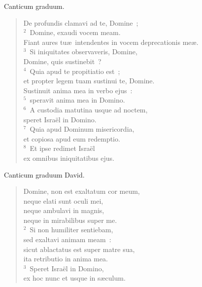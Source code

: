 \bchapter
\lettrine[lines=3,image=true,loversize=0.05,lraise=-0.03]{C}{}anticum graduum. \begin{flushleft}\begin{verse}\vspace{6pt}De profundis clamavi ad te, Domine~;\\
${}^{2}$~Domine, exaudi vocem meam.\\ Fiant aures tu\ae\ intendentes in vocem deprecationis me\ae .\\
${}^{3}$~Si iniquitates observaveris, Domine,\\ Domine, quis sustinebit~?\\
${}^{4}$~Quia apud te propitiatio est~;\\ et propter legem tuam sustinui te, Domine.\\ Sustinuit anima mea in verbo ejus~:\\
${}^{5}$~speravit anima mea in Domino.\\
${}^{6}$~A custodia matutina usque ad noctem,\\ speret Isra\"el in Domino.\\
${}^{7}$~Quia apud Dominum misericordia,\\ et copiosa apud eum redemptio.\\
${}^{8}$~Et ipse redimet Isra\"el\\ ex omnibus iniquitatibus ejus.\end{verse}\end{flushleft}



\bchapter
\lettrine[lines=3,image=true,loversize=0.05,lraise=-0.03]{C}{}anticum graduum David. \begin{flushleft}\begin{verse}\vspace{6pt}Domine, non est exaltatum cor meum,\\ neque elati sunt oculi mei,\\ neque ambulavi in magnis,\\ neque in mirabilibus super me.\\
${}^{2}$~Si non humiliter sentiebam,\\ sed exaltavi animam meam~:\\ sicut ablactatus est super matre sua,\\ ita retributio in anima mea.\\
${}^{3}$~Speret Isra\"el in Domino,\\ ex hoc nunc et usque in s\ae culum.\end{verse}\end{flushleft}



